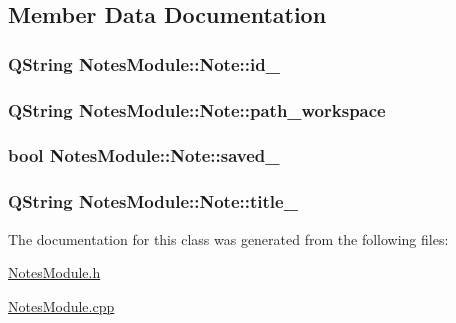 \subsection{Member Data Documentation}
\hypertarget{class_notes_module_1_1_note_aba42f4f45b094e089c594c5e7b902820}{
\subsubsection[{id\-\_\-}]{\setlength{\rightskip}{0pt plus 5cm}Q\-String Notes\-Module\-::\-Note\-::id\-\_\-\hspace{0.3cm}{\ttfamily [protected]}}}\label{class_notes_module_1_1_note_aba42f4f45b094e089c594c5e7b902820}
\hypertarget{class_notes_module_1_1_note_acc82121a6739b5e02f5e61d5ef141504}{
\subsubsection[{path\-\_\-workspace}]{\setlength{\rightskip}{0pt plus 5cm}Q\-String Notes\-Module\-::\-Note\-::path\-\_\-workspace\hspace{0.3cm}{\ttfamily [protected]}}}\label{class_notes_module_1_1_note_acc82121a6739b5e02f5e61d5ef141504}
\hypertarget{class_notes_module_1_1_note_af36a9fdf26266d2b07ec3d31556f3f68}{
\subsubsection[{saved\-\_\-}]{\setlength{\rightskip}{0pt plus 5cm}bool Notes\-Module\-::\-Note\-::saved\-\_\-\hspace{0.3cm}{\ttfamily [protected]}}}\label{class_notes_module_1_1_note_af36a9fdf26266d2b07ec3d31556f3f68}
\hypertarget{class_notes_module_1_1_note_a1fbc6b72592111121646e63e545c6539}{
\subsubsection[{title\-\_\-}]{\setlength{\rightskip}{0pt plus 5cm}Q\-String Notes\-Module\-::\-Note\-::title\-\_\-\hspace{0.3cm}{\ttfamily [protected]}}}\label{class_notes_module_1_1_note_a1fbc6b72592111121646e63e545c6539}


The documentation for this class was generated from the following files\-:\begin{DoxyCompactItemize}
\item 
\hyperlink{_notes_module_8h}{Notes\-Module.\-h}\item 
\hyperlink{_notes_module_8cpp}{Notes\-Module.\-cpp}\end{DoxyCompactItemize}
